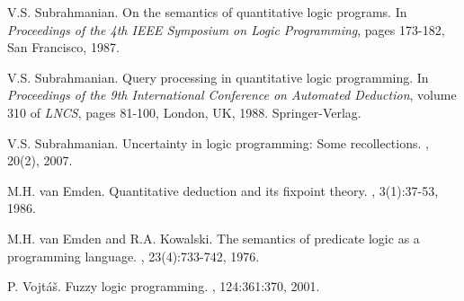 \documentclass{sigplanconf}
\theoremstyle{definition}
\theoremstyle{plain}
\begin{document}
\begin{thebibliography}{22}
V.S. Subrahmanian.
\newblock On the semantics of quantitative logic programs.
\newblock In {\em Proceedings of the 4th IEEE Symposium on Logic Programming}, pages 173-182, San Francisco, 1987.

V.S. Subrahmanian.
\newblock Query processing in quantitative logic programming.
\newblock In {\em Proceedings of the 9th International Conference on Automated Deduction}, volume 310 of {\em LNCS}, pages 81-100, London, UK, 1988. Springer-Verlag.

V.S. Subrahmanian.
\newblock Uncertainty in logic programming: Some recollections.
, 20(2), 2007.

M.H. van Emden.
\newblock Quantitative deduction and its fixpoint theory.
, 3(1):37-53, 1986.

M.H. van Emden and R.A. Kowalski.
\newblock The semantics of predicate logic as a programming language.
, 23(4):733-742, 1976.

P. Vojt\'a\v{s}.
\newblock Fuzzy logic programming.
, 124:361:370, 2001.
\end{thebibliography}
\end{document}
